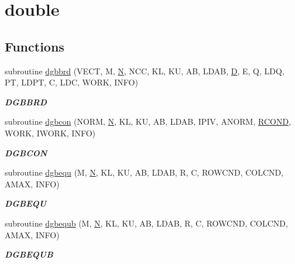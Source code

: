 \hypertarget{group__doubleGBcomputational}{}\section{double}
\label{group__doubleGBcomputational}
\subsection*{Functions}
\begin{DoxyCompactItemize}
\item 
subroutine \hyperlink{group__doubleGBcomputational_gadcc28a5e7f0df2097dc2bfbe2d287621}{dgbbrd} (V\+E\+C\+T, M, \hyperlink{polmisc_8c_a0240ac851181b84ac374872dc5434ee4}{N}, N\+C\+C, K\+L, K\+U, A\+B, L\+D\+A\+B, \hyperlink{odrpack_8h_a7dae6ea403d00f3687f24a874e67d139}{D}, E, Q, L\+D\+Q, P\+T, L\+D\+P\+T, C, L\+D\+C, W\+O\+R\+K, I\+N\+F\+O)
\begin{DoxyCompactList}\small\item\em {\bfseries D\+G\+B\+B\+R\+D} \end{DoxyCompactList}\item 
subroutine \hyperlink{group__doubleGBcomputational_gac5177acc7bb06382c90e88f12ed784ff}{dgbcon} (N\+O\+R\+M, \hyperlink{polmisc_8c_a0240ac851181b84ac374872dc5434ee4}{N}, K\+L, K\+U, A\+B, L\+D\+A\+B, I\+P\+I\+V, A\+N\+O\+R\+M, \hyperlink{superlu__enum__consts_8h_af00a42ecad444bbda75cde1b64bd7e72a9b5c151728d8512307565994c89919d5}{R\+C\+O\+N\+D}, W\+O\+R\+K, I\+W\+O\+R\+K, I\+N\+F\+O)
\begin{DoxyCompactList}\small\item\em {\bfseries D\+G\+B\+C\+O\+N} \end{DoxyCompactList}\item 
subroutine \hyperlink{group__doubleGBcomputational_gaa5c4d4757c088ae38c54a8ac0a2fcac2}{dgbequ} (M, \hyperlink{polmisc_8c_a0240ac851181b84ac374872dc5434ee4}{N}, K\+L, K\+U, A\+B, L\+D\+A\+B, R, C, R\+O\+W\+C\+N\+D, C\+O\+L\+C\+N\+D, A\+M\+A\+X, I\+N\+F\+O)
\begin{DoxyCompactList}\small\item\em {\bfseries D\+G\+B\+E\+Q\+U} \end{DoxyCompactList}\item 
subroutine \hyperlink{group__doubleGBcomputational_ga6ad24b82a2e754b670bbe3b223f0df3e}{dgbequb} (M, \hyperlink{polmisc_8c_a0240ac851181b84ac374872dc5434ee4}{N}, K\+L, K\+U, A\+B, L\+D\+A\+B, R, C, R\+O\+W\+C\+N\+D, C\+O\+L\+C\+N\+D, A\+M\+A\+X, I\+N\+F\+O)
\begin{DoxyCompactList}\small\item\em {\bfseries D\+G\+B\+E\+Q\+U\+B} \end{DoxyCompactList}\item 

\end{DoxyCompactItemize}
